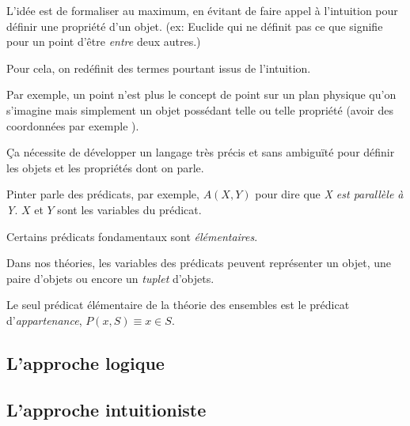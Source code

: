 \documentclass[fleqn,a4paper,nobib]{tufte-handout}
\begin{document}
L'idée est de formaliser au maximum, en évitant de faire appel à
l'intuition pour définir une propriété d'un objet. (ex: Euclide
qui ne définit pas ce que signifie pour un point d'être \textit{entre}
deux autres.)

Pour cela, on redéfinit des termes pourtant issus de l'intuition.

Par exemple, un point n'est plus le concept de point sur un plan
physique qu'on s'imagine mais simplement un objet possédant telle
ou telle propriété (avoir des coordonnées par exemple
).

Ça nécessite de développer un langage très précis et sans
ambiguïté pour définir les objets et les propriétés dont on parle.

Pinter parle des prédicats, par exemple, $A(X, Y)$ pour dire
que \textit{X est parallèle à Y}. $X$ et $Y$ sont les
variables du prédicat. 

Certains prédicats fondamentaux sont \textit{élémentaires}.

Dans nos théories, les variables des prédicats peuvent représenter
un objet, une paire d'objets ou encore un \textit{tuplet}
 d'objets.

Le seul prédicat élémentaire de la théorie des ensembles
est le prédicat d'\textit{appartenance}, $P(x, S) \equiv x \in S$.

\subsection{L'approche logique}

\subsection{L'approche intuitioniste}
\end{document}
